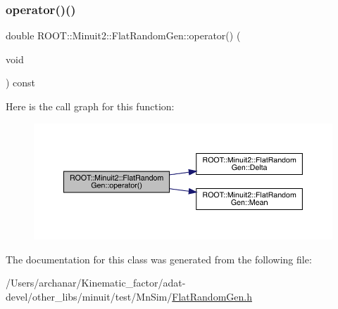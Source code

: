 \subsubsection{\texorpdfstring{operator()()}{operator()()}\hspace{0.1cm}{\footnotesize\ttfamily [2/2]}}
{\footnotesize\ttfamily double R\+O\+O\+T\+::\+Minuit2\+::\+Flat\+Random\+Gen\+::operator() (\begin{DoxyParamCaption}\item[{void}]{ }\end{DoxyParamCaption}) const\hspace{0.3cm}{\ttfamily [inline]}}

Here is the call graph for this function\+:
\nopagebreak
\begin{figure}[H]
\begin{center}
\leavevmode
\includegraphics[width=350pt]{dc/d91/classROOT_1_1Minuit2_1_1FlatRandomGen_ac04ef969864af18fdfdc104f2491e031_cgraph}
\end{center}
\end{figure}


The documentation for this class was generated from the following file\+:\begin{DoxyCompactItemize}
\item 
/\+Users/archanar/\+Kinematic\+\_\+factor/adat-\/devel/other\+\_\+libs/minuit/test/\+Mn\+Sim/\mbox{\hyperlink{adat-devel_2other__libs_2minuit_2test_2MnSim_2FlatRandomGen_8h}{Flat\+Random\+Gen.\+h}}\end{DoxyCompactItemize}
